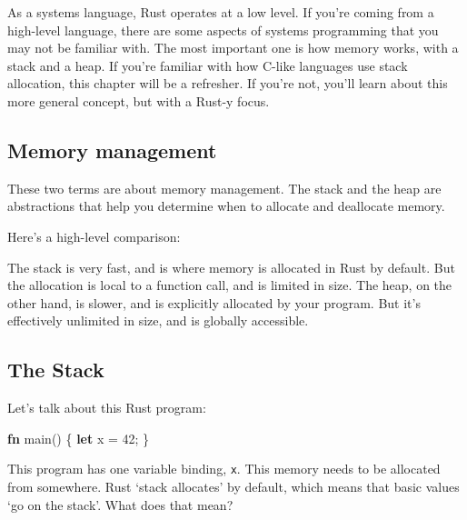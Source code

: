 \documentclass[a4paper,]{book}
\newenvironment{Shaded}{\begin{snugshade}}{\end{snugshade}}
\newcommand{\KeywordTok}[1]{\textcolor[rgb]{0.13,0.29,0.53}{\textbf{{#1}}}}
\newcommand{\DecValTok}[1]{\textcolor[rgb]{0.00,0.00,0.81}{{#1}}}
\newcommand{\NormalTok}[1]{{#1}}
\begin{document}

As a systems language, Rust operates at a low level. If you're coming
from a high-level language, there are some aspects of systems
programming that you may not be familiar with. The most important one is
how memory works, with a stack and a heap. If you're familiar with how
C-like languages use stack allocation, this chapter will be a refresher.
If you're not, you'll learn about this more general concept, but with a
Rust-y focus.

\subsection{Memory management}\label{memory-management}

These two terms are about memory management. The stack and the heap are
abstractions that help you determine when to allocate and deallocate
memory.

Here's a high-level comparison:

The stack is very fast, and is where memory is allocated in Rust by
default. But the allocation is local to a function call, and is limited
in size. The heap, on the other hand, is slower, and is explicitly
allocated by your program. But it's effectively unlimited in size, and
is globally accessible.

\subsection{The Stack}\label{the-stack}

Let's talk about this Rust program:

\begin{Shaded}
\begin{Highlighting}[]
\KeywordTok{fn} \NormalTok{main() \{}
    \KeywordTok{let} \NormalTok{x = }\DecValTok{42}\NormalTok{;}
\NormalTok{\}}
\end{Highlighting}
\end{Shaded}

This program has one variable binding, \texttt{x}. This memory needs to
be allocated from somewhere. Rust `stack allocates' by default, which
means that basic values `go on the stack'. What does that mean?
\end{document}
